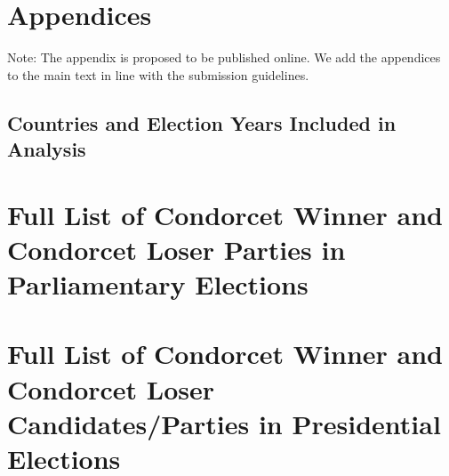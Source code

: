 \documentclass[12pt]{scrartcl}
\begin{document}
\singlespacing
%


%

\appendix
\section*{Appendices}

Note: The appendix is  proposed to be published online. We add the appendices to the main text in line with the submission guidelines. 

\singlespacing
\newpage
\begin{landscape}
\section{Countries and Election Years Included in Analysis}

\end{landscape}
	
\section{Full List of Condorcet Winner and Condorcet Loser Parties in Parliamentary Elections}
%	
	
\section{Full List of Condorcet Winner and Condorcet Loser Candidates/Parties in Presidential Elections}

%
\end{document}
